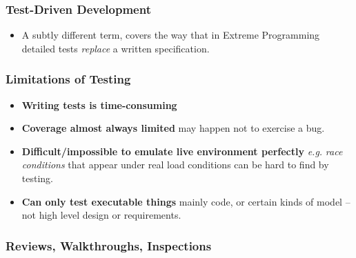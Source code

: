 \documentclass[a4paper]{article}
\providecommand{\tightlist}{%
  \setlength{\itemsep}{0pt}\setlength{\parskip}{0pt}}
\begin{document}
\hypertarget{test-driven-development}{%
\subsubsection{Test-Driven Development}\label{test-driven-development}}

\begin{itemize}
\tightlist
\item
  A subtly different term, covers the way that in Extreme Programming
  detailed tests \emph{replace} a written specification.
\end{itemize}

\hypertarget{limitations-of-testing}{%
\subsubsection{Limitations of Testing}\label{limitations-of-testing}}

\begin{itemize}
\item
  \textbf{Writing tests is time-consuming}
\item
  \textbf{Coverage almost always limited} may happen not to exercise a
  bug.
\item
  \textbf{Difficult/impossible to emulate live environment perfectly}
  \emph{e.g.} \emph{race conditions} that appear under real load
  conditions can be hard to find by testing.
\item
  \textbf{Can only test executable things} mainly code, or certain kinds
  of model -- not high level design or requirements.
\end{itemize}

\hypertarget{reviews-walkthroughs-inspections}{%
\subsubsection{Reviews, Walkthroughs,
Inspections}\label{reviews-walkthroughs-inspections}}
\end{document}
